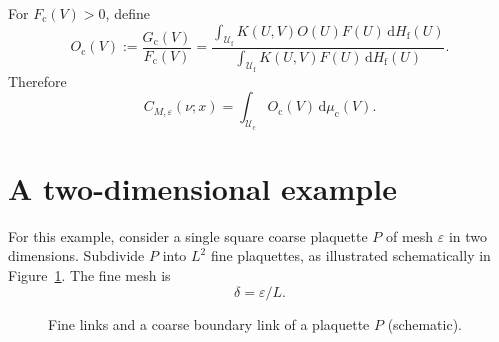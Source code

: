 \documentclass[10pt,reqno]{amsart}
\theoremstyle{definition}
\theoremstyle{remark}
\numberwithin{equation}{section}
\numberwithin{figure}{section}
\newcommand{\dd}{\mathrm d}
\newcommand{\e}{\varepsilon}
\newcommand{\Uf}{\mathcal U_{\mathrm f}}
\newcommand{\Uc}{\mathcal U_{\mathrm c}}
\newcommand{\Hf}{H_{\mathrm f}}
\newcommand{\Fc}{F_{\mathrm c}}
\newcommand{\Gc}{G_{\mathrm c}}
\newcommand{\Oc}{O_{\mathrm c}}
\newcommand{\muc}{\mu_{\mathrm c}}
\begin{document}
For $\Fc(V)>0$, define
\begin{equation}\label{eq:coarse-observable}
\Oc(V)
:=\frac{\Gc(V)}{\Fc(V)} =\frac{\displaystyle\int_{\Uf}K(U,V)O(U)F(U)\,\dd\Hf(U)}
 {\displaystyle\int_{\Uf}K(U,V)F(U)\,\dd\Hf(U)}.
\end{equation}
Therefore
\begin{equation}\label{eq:display-041}
C_{M,\e}(\nu;x)=\int_{\Uc}\Oc(V)\,\dd\muc(V).
\end{equation}

\section{A two-dimensional example}

For this example, consider a single square coarse plaquette $P$ of mesh $\e$ in two dimensions.
Subdivide $P$ into $L^2$ fine plaquettes, as illustrated schematically in Figure~\ref{fig:fine-coarse}. The fine mesh is
\begin{equation}\label{eq:display-042}
\delta=\e/L.
\end{equation}

\begin{figure}[htbp]
\centering
{}
\caption{Fine links and a coarse boundary link of a plaquette $P$ (schematic).}
\label{fig:fine-coarse}
\end{figure}
\end{document}
